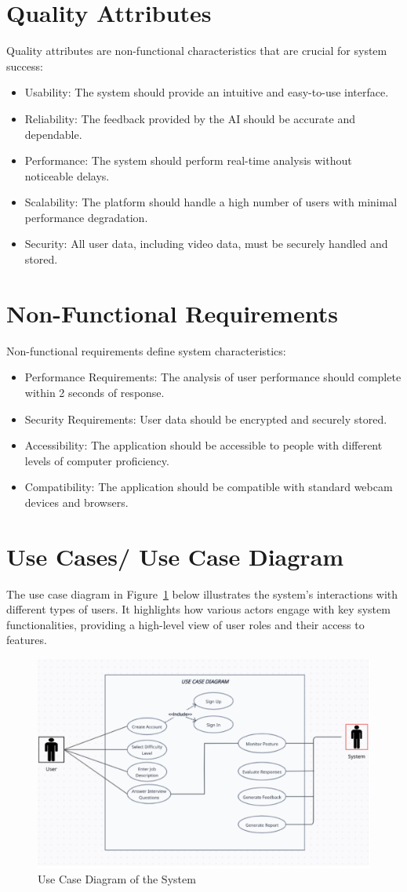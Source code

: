 \section{Quality Attributes} Quality attributes are non-functional characteristics that are crucial for system success: \begin{itemize} \item Usability: The system should provide an intuitive and easy-to-use interface. \item Reliability: The feedback provided by the AI should be accurate and dependable. \item Performance: The system should perform real-time analysis without noticeable delays. \item Scalability: The platform should handle a high number of users with minimal performance degradation. \item Security: All user data, including video data, must be securely handled and stored. \end{itemize}

\section{Non-Functional Requirements} Non-functional requirements define system characteristics: \begin{itemize} \item Performance Requirements: The analysis of user performance should complete within 2 seconds of response. \item Security Requirements: User data should be encrypted and securely stored. \item Accessibility: The application should be accessible to people with different levels of computer proficiency. \item Compatibility: The application should be compatible with standard webcam devices and browsers. \end{itemize}

\section{Use Cases/ Use Case Diagram} The use case diagram in Figure~\ref{fig
} below illustrates the system’s interactions with different types of users. It highlights how various actors engage with key system functionalities, providing a high-level view of user roles and their access to features.

\begin{figure}[h] \centering \includegraphics[width=0.5\linewidth]{sections/diagrams/UseCase.png} \caption{Use Case Diagram of the System} \label{fig
} \end{figure}

